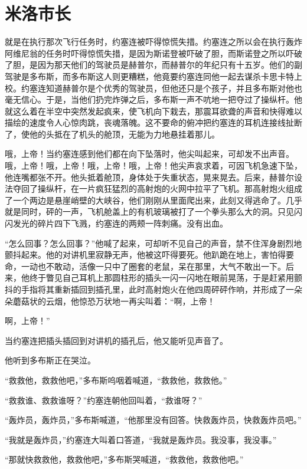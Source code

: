 \chapter{米洛市长}
 
    就是在执行那次飞行任务时，约塞连被吓得惊慌失措。约塞连之所以会在执行轰炸阿维尼翁的任务时吓得惊慌失措，是因为斯诺登被吓破了胆，而斯诺登之所以吓破了胆，是因为那天他们的驾驶员是赫普尔，而赫普尔的年纪只有十五岁。他们的副驾驶是多布斯，而多布斯这人则更糟糕，他竟要约塞连同他一起去谋杀卡思卡特上校。约塞连知道赫普尔是个优秀的驾驶员，但他还只是个孩子，并且多布斯对他也毫无信心。于是，当他们扔完炸弹之后，多布斯一声不吭地一把夺过了操纵杆。他就这么着在半空中突然发起疯来，使飞机向下栽去，那震耳欲聋的声音和快得难以描绘的速度令人心惊肉跳，丧魂落魄。这不要命的俯冲把约塞连的耳机连接线扯断了，使他的头抵在了机头的舱顶，无能为力地悬挂着那儿。

    哦，上帝！当约塞连感到他们都在向下坠落时，他尖叫起来，可却发不出声音。哦，上帝！哦，上帝！哦，上帝！哦，上帝！他尖声哀求着，可因飞机急速下坠，他连嘴都张不开。他头抵着舱顶，身体处于失重状态，晃来晃去。后来，赫普尔设法夺回了操纵杆，在一片疯狂猛烈的高射炮的火网中拉平了飞机。那高射炮火组成了一个两边是悬崖峭壁的大峡谷，他们刚刚从里面爬出来，此刻又得逃命了。几乎就是同时，砰的一声，飞机舱盖上的有机玻璃被打了一个拳头那么大的洞。只见闪闪发光的碎片四下飞溅，约塞连的两颊一阵刺痛。没有出血。

    “怎么回事？怎么回事？”他喊了起来，可却听不见自己的声音，禁不住浑身剧烈地颤抖起来。他的对讲机里寂静无声，他被这吓得要死。他趴跪在地上，害怕得要命，一动也不敢动，活像一只中了圈套的老鼠，呆在那里，大气不敢出一下。后来，他终于瞥见自己耳机上那圆柱形的插头一闪一闪地在眼前晃荡，于是赶紧用颤抖的手指将其重新插回到插孔里，此时高射炮火在他四周砰砰作响，并形成了一朵朵蘑菇状的云烟，他惊恐万状地一再尖叫着：“啊，上帝！

    啊，上帝！”

    当约塞连把插头插回到对讲机的插孔后，他又能听见声音了。

    他听到多布斯正在哭泣。

    “救救他，救救他吧，”多布斯呜咽着喊道，“救救他，救救他。”

    “救救谁、救救谁呀？”约塞连朝他回叫着，“救谁呀？”

    “轰炸员，轰炸员，”多布斯喊道，“他那里没有回答。快救轰炸员，快救轰炸员吧。”

    “我就是轰炸员，”约塞连大叫着口答道，“我就是轰炸员。我没事，我没事。”

    “那就快救救他，救救他吧，”多布斯哭喊道，“救救他，救救他吧。”

